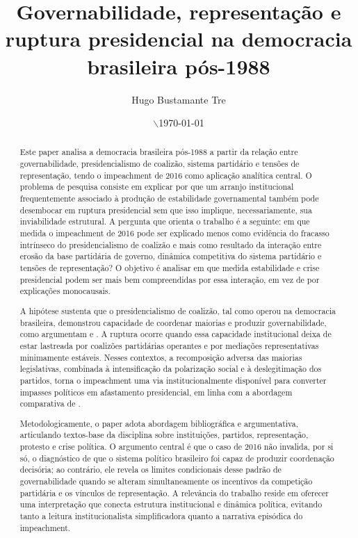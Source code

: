 \documentclass[12pt,a4paper]{article}
\author{Hugo Bustamante Tre}
\date{$\backslash$\today}
\title{Governabilidade, representação e ruptura presidencial na democracia brasileira pós-1988}
\begin{document}
\makemytitle

\begin{abstract}
Este paper analisa a democracia brasileira pós-1988 a partir da relação entre governabilidade, presidencialismo de coalizão, sistema partidário e tensões de representação, tendo o impeachment de 2016 como aplicação analítica central. O problema de pesquisa consiste em explicar por que um arranjo institucional frequentemente associado à produção de estabilidade governamental também pode desembocar em ruptura presidencial sem que isso implique, necessariamente, sua inviabilidade estrutural. A pergunta que orienta o trabalho é a seguinte: em que medida o impeachment de 2016 pode ser explicado menos como evidência do fracasso intrínseco do presidencialismo de coalizão e mais como resultado da interação entre erosão da base partidária de governo, dinâmica competitiva do sistema partidário e tensões de representação? O objetivo é analisar em que medida estabilidade e crise presidencial podem ser mais bem compreendidas por essa interação, em vez de por explicações monocausais.

A hipótese sustenta que o presidencialismo de coalizão, tal como operou na democracia brasileira, demonstrou capacidade de coordenar maiorias e produzir governabilidade, como argumentam \textcite{palermo2000_como_se} e \textcite{limongi2017_a_crise}. A ruptura ocorre quando essa capacidade institucional deixa de estar lastreada por coalizões partidárias operantes e por mediações representativas minimamente estáveis. Nesses contextos, a recomposição adversa das maiorias legislativas, combinada à intensificação da polarização social e à deslegitimação dos partidos, torna o impeachment uma via institucionalmente disponível para converter impasses políticos em afastamento presidencial, em linha com a abordagem comparativa de \textcite{perez_lian2016_explaining_military}.

Metodologicamente, o paper adota abordagem bibliográfica e argumentativa, articulando textos-base da disciplina sobre instituições, partidos, representação, protesto e crise política. O argumento central é que o caso de 2016 não invalida, por si só, o diagnóstico de que o sistema político brasileiro foi capaz de produzir coordenação decisória; ao contrário, ele revela os limites condicionais desse padrão de governabilidade quando se alteram simultaneamente os incentivos da competição partidária e os vínculos de representação. A relevância do trabalho reside em oferecer uma interpretação que conecta estrutura institucional e dinâmica política, evitando tanto a leitura institucionalista simplificadora quanto a narrativa episódica do impeachment.
\end{abstract}
\end{document}
